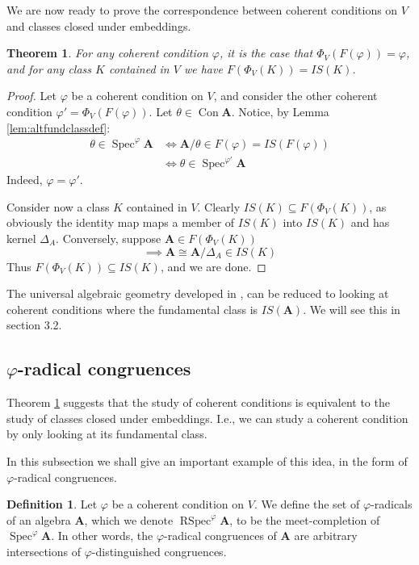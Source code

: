 \documentclass{article}
\theoremstyle{plain}
\newtheorem{theorem}{Theorem}[section]
\theoremstyle{definition}
\newtheorem{definition}{Definition}[section]
\newcommand{\Spec}{\operatorname{Spec}}
\newcommand{\RSpec}{\operatorname{RSpec}}
\begin{document}
We are now ready to prove the correspondence between coherent conditions on $V$ and classes closed under embeddings.

\begin{theorem} \label{theo:coherency}
    For any coherent condition $\varphi$, it is the case that $\Phi_V(F(\varphi)) = \varphi$, and for any class $K$ contained in $V$ we have $F(\Phi_V(K)) = IS(K)$.
\end{theorem}
\begin{proof}
    Let $\varphi$ be a coherent condition on $V$, and consider the other coherent condition $\varphi'= \Phi_V(F(\varphi))$.
    Let $\theta \in \operatorname{Con}\mathbf{A}$.
    Notice, by Lemma \ref{lem:altfundclassdef}:
    \begin{align*}
        \theta \in \Spec^\varphi\mathbf{A} &\iff \mathbf{A}/\theta \in F(\varphi) =IS(F(\varphi))\\
        &\iff \theta \in \Spec^{\varphi'}\mathbf{A}
    \end{align*}
    Indeed, $\varphi = \varphi'$.\par
    Consider now a class $K$ contained in $V$.
    Clearly $IS(K) \subseteq F(\Phi_V(K))$, as obviously the identity map maps a member of $IS(K)$ into $IS(K)$ and has kernel $\Delta_A$.
    Conversely, suppose $\mathbf{A}\in F(\Phi_V(K))$
    $$\implies \mathbf{A} \cong \mathbf{A}/\Delta_A \in IS(K)$$
    Thus $F(\Phi_V(K)) \subseteq IS(K)$, and we are done.
\end{proof}

The universal algebraic geometry developed in \cite{plotkin2002sevenlecturesuniversalalgebraic}, can be reduced to looking at coherent conditions where the fundamental class is $IS(\mathbf{A})$.
We will see this in section 3.2.


\subsection{$\varphi$-radical congruences}

Theorem \ref{theo:coherency} suggests that the study of coherent conditions is equivalent to the study of classes closed under embeddings.
I.e., we can study a coherent condition by only looking at its fundamental class.\par
In this subsection we shall give an important example of this idea, in the form of $\varphi$-radical congruences.

\begin{definition}
    Let $\varphi$ be a coherent condition on $V$.
    We define the set of $\varphi$-radicals of an algebra $\mathbf{A}$, which we denote $\RSpec^\varphi\mathbf{A}$, to be the meet-completion of $\Spec^\varphi\mathbf{A}$.
    In other words, the $\varphi$-radical congruences of $\mathbf{A}$ are arbitrary intersections of $\varphi$-distinguished congruences.
\end{definition}
\end{document}
